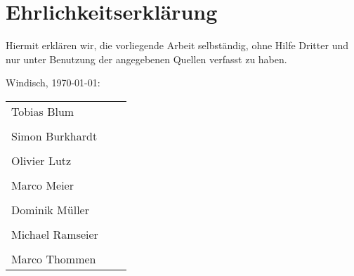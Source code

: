 \section{Ehrlichkeitserklärung}
\label{sec:Ehrlichkeitserklärung}

Hiermit erklären wir, die vorliegende Arbeit selbständig, ohne Hilfe Dritter und nur unter Benutzung der
angegebenen Quellen verfasst zu haben.

\vspace{2cm}
Windisch, \today :  
\vspace{1cm} 
\begin{table}[h!]
\def\arraystretch{2}
\begin{tabular}{llL{6cm}}
Tobias Blum			 &  & \\  
					 &  &	\\
Simon Burkhardt       &  &  \\  
					 &  &	\\
Olivier Lutz         &  &  \\ 
					 &  &	\\
Marco Meier          &  &  \\ 
					 &  &	\\
Dominik Müller       &  &  \\ 
					 &  &	\\
Michael Ramseier     &  &  \\ 
					 &  &	\\
Marco Thommen		 &  &  \\                
\end{tabular}
\end{table}


